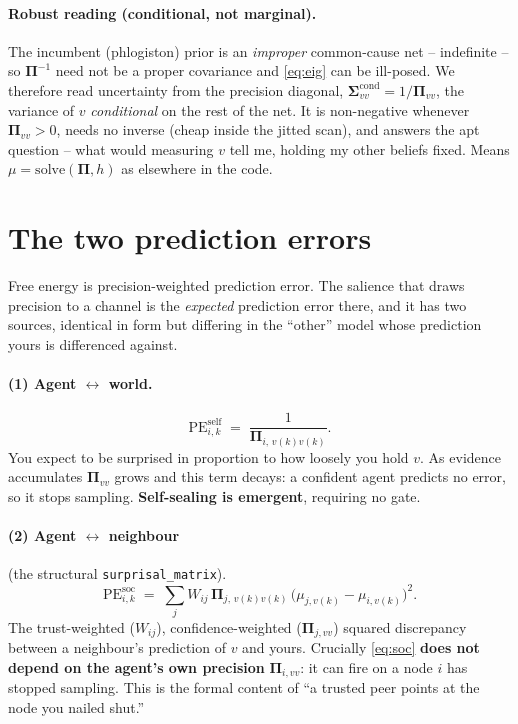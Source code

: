\documentclass[11pt]{article}
\newcommand{\Pib}{\boldsymbol{\Pi}}
\newcommand{\Sib}{\boldsymbol{\Sigma}}
\begin{document}
\paragraph{Robust reading (conditional, not marginal).} The incumbent (phlogiston) prior is an
\emph{improper} common-cause net -- indefinite -- so $\Pib^{-1}$ need not be a proper covariance
and \eqref{eq:eig} can be ill-posed. We therefore read uncertainty from the precision diagonal,
$\Sib^{\mathrm{cond}}_{vv}=1/\Pib_{vv}$, the variance of $v$ \emph{conditional} on the rest of
the net. It is non-negative whenever $\Pib_{vv}>0$, needs no inverse (cheap inside the jitted
scan), and answers the apt question -- what would measuring $v$ tell me, holding my other beliefs
fixed. Means $\mu=\mathrm{solve}(\Pib,h)$ as elsewhere in the code.

\section{The two prediction errors}
Free energy is precision-weighted prediction error. The salience that draws precision to a
channel is the \emph{expected} prediction error there, and it has two sources, identical in form
but differing in the ``other'' model whose prediction yours is differenced against.

\paragraph{(1) Agent $\leftrightarrow$ world.}
\begin{equation}
\mathrm{PE}^{\mathrm{self}}_{i,k}\;=\;\frac{1}{\Pib_{i,\,v(k)v(k)}}.
\end{equation}
You expect to be surprised in proportion to how loosely you hold $v$. As evidence accumulates
$\Pib_{vv}$ grows and this term decays: a confident agent predicts no error, so it stops
sampling. \textbf{Self-sealing is emergent}, requiring no gate.

\paragraph{(2) Agent $\leftrightarrow$ neighbour} (the structural \texttt{surprisal\_matrix}).
\begin{equation}
\mathrm{PE}^{\mathrm{soc}}_{i,k}\;=\;\sum_j W_{ij}\,\Pib_{j,\,v(k)v(k)}\,
\big(\mu_{j,v(k)}-\mu_{i,v(k)}\big)^2 .
\label{eq:soc}
\end{equation}
The trust-weighted ($W_{ij}$), confidence-weighted ($\Pib_{j,vv}$) squared discrepancy between a
neighbour's prediction of $v$ and yours. Crucially \eqref{eq:soc} \textbf{does not depend on the
agent's own precision} $\Pib_{i,vv}$: it can fire on a node $i$ has stopped sampling. This is the
formal content of ``a trusted peer points at the node you nailed shut.''
\end{document}
